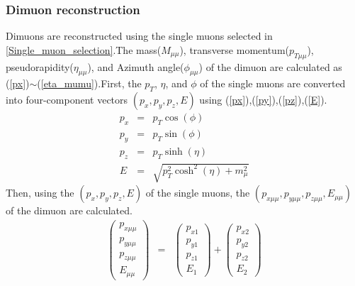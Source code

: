             \subsubsection{Dimuon reconstruction}
            \label{Dimuon_reco}
                Dimuons are reconstructed using the single muons selected in \ref{Single_muon_selection}.\@ The mass($M_{\mu\mu}$), transverse\- momentum($p_{T\mu\mu}$), pseudorapidity($\eta_{\mu\mu}$), and Azimuth angle($\phi_{\mu\mu}$) of the dimuon are calculated as (\ref{px})$\sim$(\ref{eta_mumu}).\@ First, the $p_T$, $\eta$, and $\phi$ of the single muons are converted into four-component vectors $(p_x, p_y, p_z, E)$ using (\ref{px}),(\ref{py}),(\ref{pz}),(\ref{E}).\@
                \begin{eqnarray}
                    \label{px}
                    p_x &=& p_T \cos(\phi)\\
                    \label{py}
                    p_y &=& p_T \sin (\phi)\\ 
                    \label{pz}
                    p_z &=& p_T \sinh (\eta)\\ 
                    \label{E} 
                    E &=& \sqrt{p_T^2 \cosh^2(\eta) + m_\mu^2}
                \end{eqnarray}
                Then, using the $(p_x, p_y, p_z, E)$ of the single muons, the $(p_{x\mu\mu},p_{y\mu\mu},p_{z\mu\mu},E_{\mu\mu})$ of the dimuon are calculated.
                \begin{eqnarray}
                    \begin{pmatrix}
                        p_{x\mu\mu} \\
                        p_{y\mu\mu} \\
                        p_{z\mu\mu} \\
                        E_{\mu\mu}
                    \end{pmatrix}
                    &=&
                    \begin{pmatrix}
                        p_{x1} \\
                        p_{y1} \\
                        p_{z1} \\
                        E_1
                    \end{pmatrix}
                    +
                    \begin{pmatrix}
                        p_{x2} \\
                        p_{y2} \\
                        p_{z2} \\
                        E_2
                    \end{pmatrix}
                \end{eqnarray}
